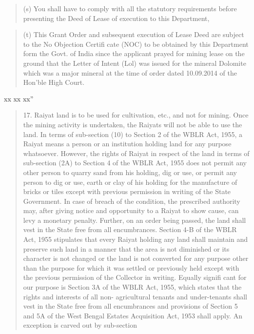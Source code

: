 \documentclass[12pt,a4paper]{article}
\newenvironment{judgequote}
  {\begin{quote}\small}
  {\end{quote}}
\begin{document}
\begin{judgequote}
(s) You shall have to comply with all the statutory requirements before
presenting the Deed of Lease of execution to this Department,
\end{judgequote}

\begin{judgequote}
(t) This Grant Order and subsequent execution of Lease Deed are
subject to the No Objection Certifi cate (NOC) to be obtained by this
Department form the Govt. of India since the applicant prayed for
mining lease on the ground that the Letter of Intent (Lol) was issued
for the mineral Dolomite which was a major mineral at the time of
order dated 10.09.2014 of the Hon'ble High Court.
\end{judgequote}

\noindent xx xx xx''


\begin{judgequote}
17. Raiyat land is to be used for cultivation, etc., and not for mining.
Once the mining activity is undertaken, the Raiyats will not be able to use
the land. In terms of sub-section (10) to Section 2 of the WBLR Act, 1955,
a Raiyat means a person or an institution holding land for any purpose
whatsoever. However, the rights of Raiyat in respect of the land in terms of
sub-section (2A) to Section 4 of the WBLR Act, 1955 does not permit any
other person to quarry sand from his holding, dig or use, or permit any person
to dig or use, earth or clay of his holding for the manufacture of bricks or
tiles except with previous permission in writing of the State Government.
In case of breach of the condition, the prescribed authority may, after giving
notice and opportunity to a Raiyat to show cause, can levy a monetary
penalty. Further, on an order being passed, the land shall vest in the State
free from all encumbrances. Section 4-B of the WBLR Act, 1955 stipulates
that every Raiyat holding any land shall maintain and preserve such land in
a manner that the area is not diminished or its character is not changed or
the land is not converted for any purpose other than the purpose for which
it was settled or previously held except with the previous permission of the
Collector in writing. Equally signifi cant for our purpose is Section 3A of
the WBLR Act, 1955, which states that the rights and interests of all non-
agricultural tenants and under-tenants shall vest in the State free from all
encumbrances and provisions of Section 5 and 5A of the West Bengal Estates
Acquisition Act, 1953 shall apply. An exception is carved out by sub-section
\end{judgequote}
\end{document}
